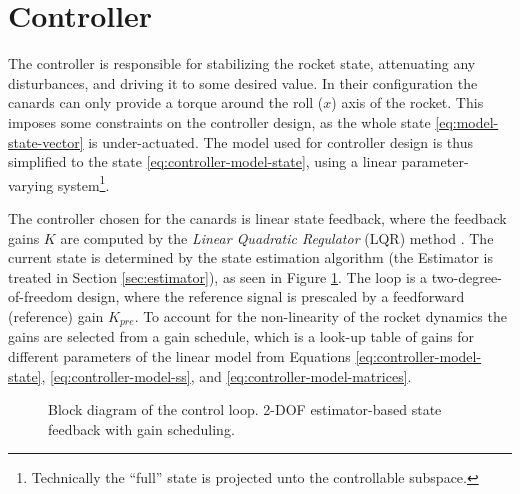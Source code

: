 \section{Controller}
The controller is responsible for stabilizing the rocket state, attenuating any disturbances, and driving it to some desired value.
In their configuration the canards can only provide a torque around the roll ($x$) axis of the rocket.
This imposes some constraints on the controller design, as the whole state \ref{eq:model-state-vector} is under-actuated.
The model used for controller design is thus simplified to the state \ref{eq:controller-model-state}, using a linear parameter-varying system\footnote{Technically the ``full'' state is projected unto the controllable subspace.}.

The controller chosen for the canards is linear state feedback, where the feedback gains $K$ are computed by the \textit{Linear Quadratic Regulator} (LQR) method \cite{werner2021, werner2021b}.
The current state is determined by the state estimation algorithm (the Estimator is treated in Section \ref{sec:estimator}), as seen in Figure \ref{fig:controller-loop}.
The loop is a two-degree-of-freedom design, where the reference signal is prescaled by a feedforward (reference) gain $K_{pre}$.
To account for the non-linearity of the rocket dynamics the gains are selected from a gain schedule, which is a look-up table of gains for different parameters of the linear model from Equations \ref{eq:controller-model-state}, 
\ref{eq:controller-model-ss}, and \ref{eq:controller-model-matrices}. 

\begin{figure}[ht]
    \centering
    \resizebox{0.8\textwidth}{!}{
    }
    \caption[Block diagram of the control loop]{Block diagram of the control loop. 2-DOF estimator-based state feedback \cite{werner2021} with gain scheduling.}
    \label{fig:controller-loop}
\end{figure}

